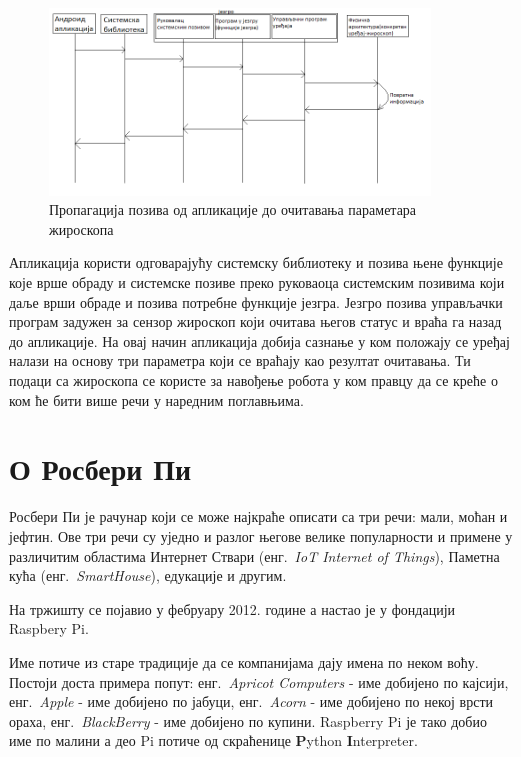 \documentclass[12pt,oneside]{memoir}
\theoremstyle{remark}
\begin{document}
\begin{figure}[!ht]
\centering
\includegraphics[width=0.9\textwidth]{slike/propagacija_poziva.png}
\caption{Пропагација позива од апликације до очитавања параметара жироскопа}
\label{fig:propagacija}
\end{figure}

Апликација користи одговарајућу системску библиотеку и позива њене функције које врше обраду и системске позиве преко руковаоца системским позивима који даље врши обраде и позива потребне функције језгра. Језгро позива управљачки програм задужен за сензор жироскоп који очитава његов статус и враћа га назад до апликације. На овај начин апликација добија сазнање у ком положају се уређај налази на основу три параметра који се враћају као резултат очитавања. Ти подаци са жироскопа се користе за навођење робота у ком правцу да се креће о ком ће бити више речи у наредним поглавњима.

\chapter{О Росбери Пи}
\label{chp:rpi}
Росбери Пи је рачунар који се може најкраће описати са три речи: мали, моћан и јефтин. Ове три речи су уједно и разлог његове велике популарности и примене у различитим областима Интернет Ствари (енг.~{\em IoT Internet of Things}), Паметна кућа (енг.~{\em SmartHouse}), едукације и другим.

На тржишту се појавио у фебруару 2012. године а настао је у фондацији Raspbery Pi.

Име потиче из старе традиције да се компанијама дају имена по неком воћу. Постоји доста примера попут: енг.~{\em Apricot Computers} - име добијено по кајсији, енг.~{\em Apple} - име добијено по јабуци, енг.~{\em Acorn} - име добијено по некој врсти ораха, енг.~{\em BlackBerry} - име добијено по купини. Raspberry Pi је тако добио име по малини а део Pi потиче од скраћенице \textbf{P}ython \textbf{I}nterpreter.
\end{document}
